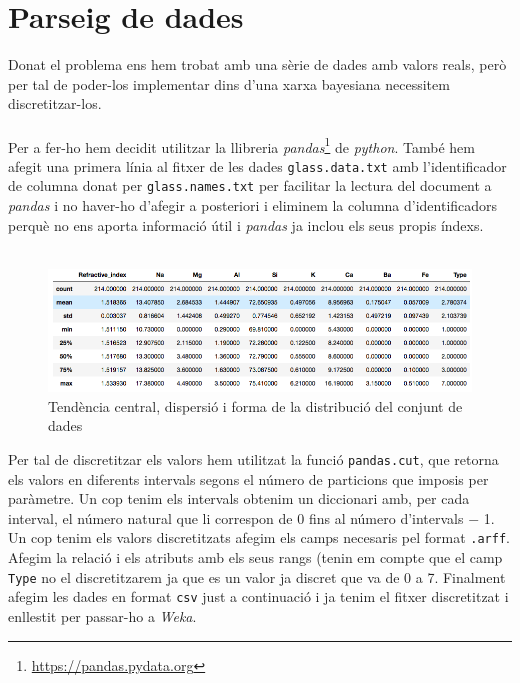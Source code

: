\documentclass[11pt,a4paper]{article}
\begin{document}
\newpage

\listoffigures
\vspace*{0.2in}
\listoftables

\newpage

\part{Parseig de dades}
Donat el problema ens hem trobat amb una sèrie de dades amb valors reals, però per tal de poder-los implementar dins d'una xarxa bayesiana necessitem discretitzar-los.\\\\ Per a fer-ho hem decidit utilitzar la llibreria \textit{pandas}\footnote{\url{https://pandas.pydata.org}} de \textit{python}. També hem afegit una primera línia al fitxer de les dades \texttt{glass.data.txt} amb l'identificador de columna donat per \texttt{glass.names.txt} per facilitar la lectura del document a \textit{pandas} i no haver-ho d'afegir a posteriori i eliminem la columna d'identificadors perquè no ens aporta informació útil i \textit{pandas} ja inclou els seus propis índexs.\\\\

\begin{figure}[H]
\centering
\includegraphics[width=\textwidth]{Figures/p1.png}
\caption{Tendència central, dispersió i forma de la distribució del conjunt de dades}
\end{figure}
\vspace*{0.2in}
Per tal de discretitzar els valors hem utilitzat la funció \texttt{pandas.cut}, que retorna els valors en diferents intervals segons el número de particions que imposis per paràmetre. Un cop tenim els intervals obtenim un diccionari amb, per cada interval, el número natural que li correspon de 0 fins al número d'intervals $-$ 1.\\

Un cop tenim els valors discretitzats afegim els camps necesaris pel format \texttt{.arff}. Afegim la relació i els atributs amb els seus rangs (tenin em compte que el camp \texttt{Type} no el discretitzarem ja que es un valor ja discret que va de 0 a 7. Finalment afegim les dades en format \texttt{csv} just a continuació i ja tenim el fitxer discretitzat i enllestit per passar-ho a \textit{Weka}.\\
\end{document}
